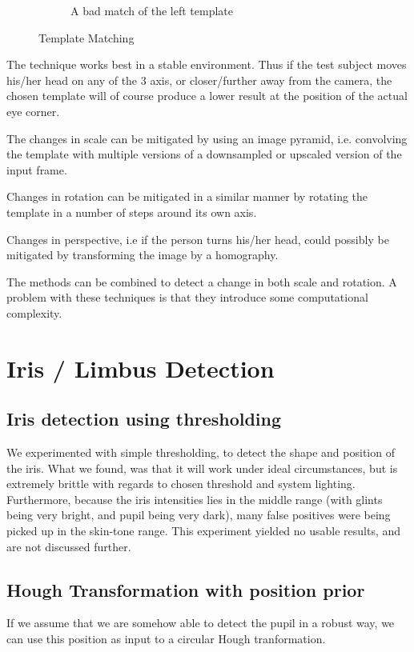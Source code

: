 \documentclass[a4paper,11pt]{article}
\begin{document}
\begin{figure}[H]
\begin{subfigure}{.32\textwidth}
  \caption{A bad match of the left template}
  \label{fig:templatemathing2}
\end{subfigure}
\caption{Template Matching }
\label{fig:templatemathing}
\end{figure}

The technique works best in a stable environment. Thus if the test subject moves his/her head on any of the 3 axis, or closer/further away from the camera, the chosen template will of course produce a lower result at the position of the actual eye corner.

The changes in scale can be mitigated by using an image pyramid, i.e. convolving the template with multiple versions of a downsampled or upscaled version of the input frame.

Changes in rotation can be mitigated in a similar manner by rotating the template in a number of steps around its own axis.

Changes in perspective, i.e if the person turns his/her head, could possibly be mitigated by transforming the image by a homography.

The methods can be combined to detect a change in both scale and rotation. A problem with these techniques is that they introduce some computational complexity.



\section{Iris / Limbus Detection}
\subsection{Iris detection using thresholding}
We experimented with simple thresholding, to detect the shape and position of the iris. What we found, was that it will work under ideal circumstances, but is extremely brittle with regards to chosen threshold and system lighting. Furthermore, because the iris intensities lies in the middle range (with glints being very bright, and pupil being very dark), many false positives were being picked up in the skin-tone range. This experiment yielded no usable results, and are not discussed further.
\subsection{Hough Transformation with position prior}
If we assume that we are somehow able to detect the pupil in a robust way, we can use this position as input to a circular Hough tranformation.
\end{document}

